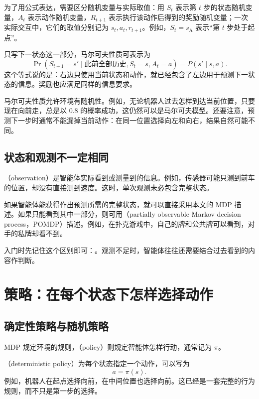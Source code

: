 \documentclass[UTF8]{ctexart}
\begin{document}
为了用公式表达，需要区分随机变量与实际取值：用 $S_t$ 表示第 $t$ 步的状态随机变量，$A_t$ 表示动作随机变量，$R_{t+1}$ 表示执行该动作后得到的奖励随机变量；一次实际交互中，它们的取值分别记为 $s_t,a_t,r_{t+1}$。例如，$S_t=s_{\mathrm A}$ 表示“第 $t$ 步处于起点”。

只写下一状态这一部分，马尔可夫性质可表示为
\begin{equation}
  \Pr(S_{t+1}=s'\mid \text{此前全部历史},S_t=s,A_t=a)
  =P(s'\mid s,a).
  \label{eq:mdp-markov}
\end{equation}
这个等式说的是：右边只使用当前状态和动作，就已经包含了左边用于预测下一状态的信息。奖励也应满足同样的信息要求。

马尔可夫性质允许环境有随机性。例如，无论机器人过去怎样到达当前位置，只要现在向前走，总是以 $0.8$ 的概率成功，这仍然可以是马尔可夫模型。还要注意，预测下一步时通常不能漏掉当前动作：在同一位置选择向左和向右，结果自然可能不同。

\subsection{状态和观测不一定相同}

（observation）是智能体实际看到或测量到的信息。例如，传感器可能只测到前车的位置，却没有直接测到速度。这时，单次观测未必包含完整状态。

如果智能体能获得作出预测所需的完整状态，就可以直接采用本文的 MDP 描述。如果只能看到其中一部分，则可用（partially observable Markov decision process，POMDP）描述。例如，在扑克游戏中，自己的牌和公共牌可以看到，对手的私牌却看不到。

入门时先记住这个区别即可：。观测不足时，智能体往往还需要结合过去看到的内容作判断。

\section{策略：在每个状态下怎样选择动作}
\label{sec:mdp-policy}

\subsection{确定性策略与随机策略}

MDP 规定环境的规则，（policy）则规定智能体怎样行动，通常记为 $\pi$。

（deterministic policy）为每个状态指定一个动作，可以写为
\[
  a=\pi(s).
\]
例如，机器人在起点选择向前，在中间位置也选择向前。这已经是一套完整的行为规则，而不只是第一步的选择。
\end{document}
